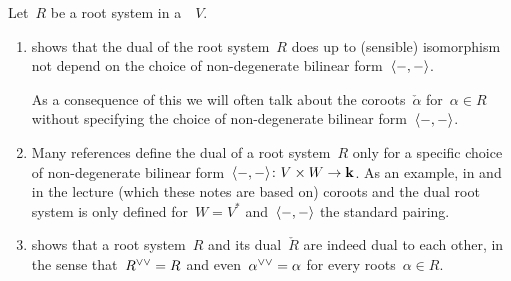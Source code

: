 \begin{remark}
  Let~$R$ be a root system in a~{\vectorspace{$\kf$}}~$V$.
  \begin{enumerate}
    \item
       shows that the dual of the root system~$R$ does up to (sensible) isomorphism not depend on the choice of non-degenerate bilinear form~$\langle-,-\rangle$.
      
      As a consequence of this we will often talk about the coroots~$\check{\alpha}$ for~$\alpha \in R$ without specifying the choice of non-degenerate bilinear form~$\langle-,-\rangle$.
    \item
      Many references define the dual of a root system~$R$ only for a specific choice of non-degenerate bilinear form~$\langle-,-\rangle \colon V \times W \to \mathbf{k}$.
      As an example, in \cite[18]{tauvel_yu} and in the lecture (which these notes are based on) coroots and the dual root system is only defined for~$W = V^*$ and~$\langle-,-\rangle$ the standard pairing.
    \item
       shows that a root system~$R$ and its dual~$\check{R}$ are indeed dual to each other, in the sense that~$\dcheck{R} = R$ and even~$\dcheck{\alpha} = \alpha$ for every roots~$\alpha \in R$.
  \end{enumerate}
\end{remark}


